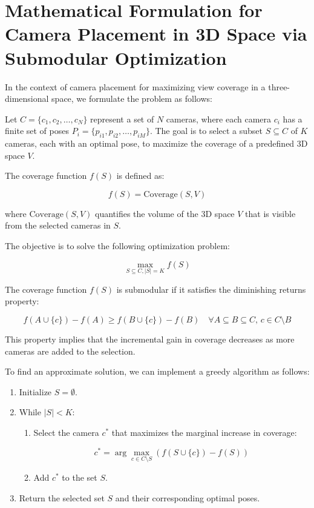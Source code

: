 \section{Mathematical Formulation for Camera Placement in 3D Space via Submodular Optimization}

In the context of camera placement for maximizing view coverage in a three-dimensional space, we formulate the problem as follows:

Let \( C = \{c_1, c_2, \ldots, c_N\} \) represent a set of \( N \) cameras, where each camera \( c_i \) has a finite set of poses \( P_i = \{p_{i1}, p_{i2}, \ldots, p_{iM}\} \). The goal is to select a subset \( S \subseteq C \) of \( K \) cameras, each with an optimal pose, to maximize the coverage of a predefined 3D space \( V \).

The coverage function \( f(S) \) is defined as:

\[
f(S) = \text{Coverage}(S, V)
\]

where \( \text{Coverage}(S, V) \) quantifies the volume of the 3D space \( V \) that is visible from the selected cameras in \( S \).

The objective is to solve the following optimization problem:

\[
\max_{S \subseteq C, |S| = K} f(S)
\]


The coverage function \( f(S) \) is submodular if it satisfies the diminishing returns property:

\[
f(A \cup \{c\}) - f(A) \geq f(B \cup \{c\}) - f(B) \quad \forall A \subseteq B \subseteq C, \, c \in C \setminus B
\]

This property implies that the incremental gain in coverage decreases as more cameras are added to the selection.


To find an approximate solution, we can implement a greedy algorithm as follows:

\begin{enumerate}
	\item Initialize \( S = \emptyset \).
	\item While \( |S| < K \):
	\begin{enumerate}
		\item Select the camera \( c^* \) that maximizes the marginal increase in coverage:
		
		\[
		c^* = \arg\max_{c \in C \setminus S} \left( f(S \cup \{c\}) - f(S) \right)
		\]
		
		\item Add \( c^* \) to the set \( S \).
	\end{enumerate}
	\item Return the selected set \( S \) and their corresponding optimal poses.
\end{enumerate}

